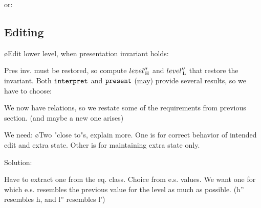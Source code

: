 or:




\subsection{Editing}

\bl
\o Edit lower level, when presentation invariant holds:
\el



Pres inv. must be restored, so compute $level''_{\, \mathrm H}$ and $level''_{\, \mathrm L}$ that restore the invariant. 
Both ${\tt interpret}$ and ${\tt present}$ (may) provide several results, so we have to choose:

We now have relations, so we restate some of the requirements from previous section. (and maybe a new one arises)

We need:
\bl
\o Two "close to"s, explain more. One is for correct behavior of intended edit and extra state. Other is for maintaining extra state only.
\el


Solution:

Have to extract one from the eq. class. Choice from e.s. values. We want one for which e.s. resembles the previous value for the level as much as possible. (h'' resembles h, and l'' resembles l')

